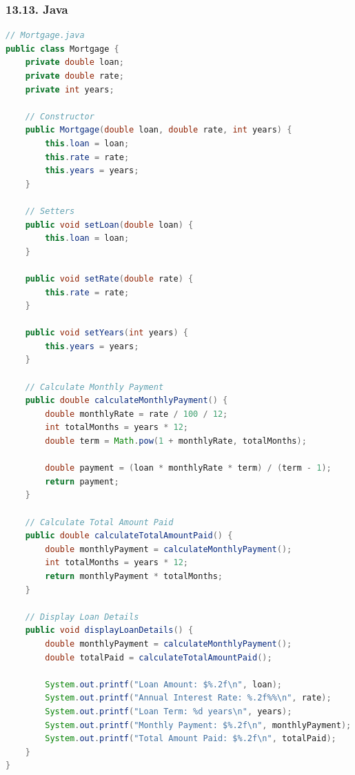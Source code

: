 \documentclass{article}
\begin{document}
\subsubsection*{13.13. Java}
\begin{lstlisting}[language=Java, caption=Mortage.java]
// Mortgage.java
public class Mortgage {
    private double loan;
    private double rate;
    private int years;

    // Constructor
    public Mortgage(double loan, double rate, int years) {
        this.loan = loan;
        this.rate = rate;
        this.years = years;
    }

    // Setters
    public void setLoan(double loan) {
        this.loan = loan;
    }

    public void setRate(double rate) {
        this.rate = rate;
    }

    public void setYears(int years) {
        this.years = years;
    }

    // Calculate Monthly Payment
    public double calculateMonthlyPayment() {
        double monthlyRate = rate / 100 / 12;
        int totalMonths = years * 12;
        double term = Math.pow(1 + monthlyRate, totalMonths);

        double payment = (loan * monthlyRate * term) / (term - 1);
        return payment;
    }

    // Calculate Total Amount Paid
    public double calculateTotalAmountPaid() {
        double monthlyPayment = calculateMonthlyPayment();
        int totalMonths = years * 12;
        return monthlyPayment * totalMonths;
    }

    // Display Loan Details
    public void displayLoanDetails() {
        double monthlyPayment = calculateMonthlyPayment();
        double totalPaid = calculateTotalAmountPaid();

        System.out.printf("Loan Amount: $%.2f\n", loan);
        System.out.printf("Annual Interest Rate: %.2f%%\n", rate);
        System.out.printf("Loan Term: %d years\n", years);
        System.out.printf("Monthly Payment: $%.2f\n", monthlyPayment);
        System.out.printf("Total Amount Paid: $%.2f\n", totalPaid);
    }
}
\end{lstlisting}
\end{document}
